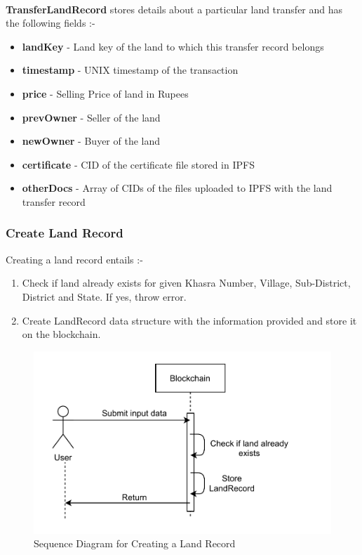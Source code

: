 \documentclass{article}
\begin{document}
        \paragraph{}
        \textbf{TransferLandRecord} stores details about a particular land transfer and has the following fields :-
        \begin{itemize}
            \item \textbf{landKey} - Land key of the land to which this transfer record belongs
            \item \textbf{timestamp} - UNIX timestamp of the transaction
            \item \textbf{price} - Selling Price of land in Rupees
            \item \textbf{prevOwner} - Seller of the land
            \item \textbf{newOwner} - Buyer of the land
            \item \textbf{certificate} - CID of the certificate file stored in IPFS
            \item \textbf{otherDocs} - Array of CIDs of the files uploaded to IPFS with the land transfer record
        \end{itemize}

    \subsubsection{Create Land Record}
        Creating a land record entails :-
        \begin{enumerate}
            \item Check if land already exists for given Khasra Number, Village, Sub-District, District and State. If yes, throw error.
            \item Create LandRecord data structure with the information provided and store it on the blockchain.
        \end{enumerate}

        \begin{figure}[htbp]
            \includegraphics[scale=0.25]{blockchain_seq_create_land}
            \centering
            \caption{Sequence Diagram for Creating a Land Record}
        \end{figure}
\end{document}

